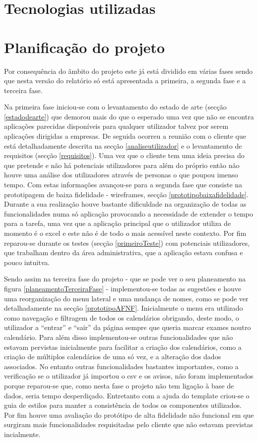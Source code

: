 \documentclass[11pt, twoside]{report}
\begin{document}
	\chapter{Tecnologias utilizadas}
	\chapter{Planificação do projeto}

 	Por consequência do âmbito do projeto este já está dividido em várias fases sendo que nesta versão do relatório só está apresentada a primeira, a segunda fase e a terceira fase.
 	
 	Na primeira fase iniciou-se com o levantamento do estado de arte (secção \ref{estadodearte}) que demorou mais do que o esperado uma vez que não se encontra aplicações parecidas disponíveis para qualquer utilizador talvez por serem aplicações dirigidas a empresas. De seguida ocorreu a reunião com o cliente que está detalhadamente descrita na secção \ref{analiseutilizador} e o levantamento de requisitos (secção \ref{requisitos}). Uma vez que o cliente tem uma ideia precisa do que pretende e não há potenciais utilizadores para além do próprio então não houve uma análise dos utilizadores através de personas o que poupou imenso tempo. Com estas informações  avançou-se para a segunda fase que consiste na prototipagem de baixa fidelidade - wireframes, secção \ref{prototipobaixafidelidade}. Durante a sua realização houve bastante dificuldade na organização de todas as funcionalidades numa só aplicação provocando a necessidade de extender o tempo para a tarefa, uma vez que a aplicação principal que o utilizador utiliza de momento é o excel e este não é de todo o mais acessível neste contexto. Por fim reparou-se durante os testes (secção \ref{primeiroTeste}) com potenciais utilizadores, que trabalham dentro da área administrativa, que a aplicação estava confusa e pouco intuitva.
 	
 	Sendo assim na terceira fase do projeto - que se pode ver o seu planeamento na figura \ref{planeamentoTerceiraFase} - implementou-se todas as sugestões e houve uma reorganização do menu lateral e uma mudança de nomes, como se pode ver detalhadamente na secção \ref{prototipoAFNF}. Inicialmente o menu era utilizado como navegação e filtragem de todos os calendários obrigando, deste modo, o utilizador a ``entrar'' e ``sair'' da página sempre que queria marcar exames noutro calendário. Para além disso implementou-se outras funcionalidades que não estavam pervistas inicialmente para facilitar a criação dos calendários, como a criação de múltiplos calendários de uma só vez, e a alteração dos dados associados. No entanto outras funcionalidades bastantes importantes, como a verificação se o utilizador já importou o csv e os avisos, não foram implementados porque reparou-se que, como nesta fase o projeto não tem ligação à base de dados, seria tempo desperdiçado. Entretanto com a ajuda do template criou-se o guia de estilos para manter a consistência de todos os componentes utilizados. Por fim houve uma avaliação do protótipo de alta fidelidade não funcional em que surgiram mais funcionalidades requisitadas pelo cliente que não estavam previstas incialmente. 
	
\end{document}
